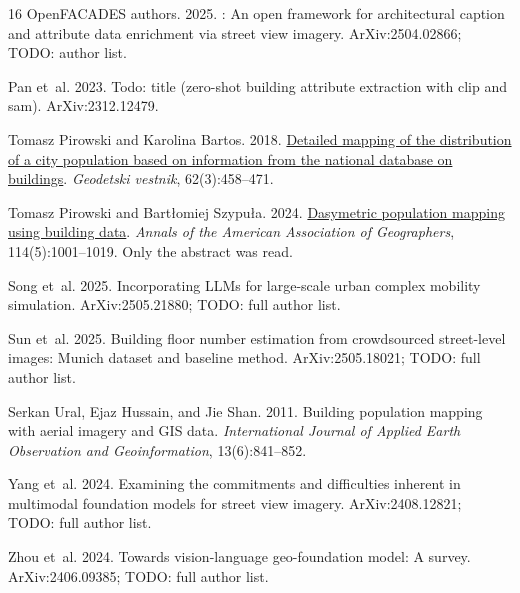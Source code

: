 \documentclass[11pt]{article}
\begin{document}
\begin{thebibliography}{16}
{OpenFACADES authors}. 2025.
: An open framework for architectural caption and
  attribute data enrichment via street view imagery.
\newblock ArXiv:2504.02866; TODO: author list.

Pan et~al. 2023.
\newblock Todo: title (zero-shot building attribute extraction with clip and
  sam).
\newblock ArXiv:2312.12479.

Tomasz Pirowski and Karolina Bartos. 2018.
\newblock \href {https://doi.org/10.15292/geodetski-vestnik.2018.03.458-471}
  {Detailed mapping of the distribution of a city population based on
  information from the national database on buildings}.
\newblock \emph{Geodetski vestnik}, 62(3):458--471.

Tomasz Pirowski and Bart{\l}omiej Szypu{\l}a. 2024.
\newblock \href {https://doi.org/10.1080/24694452.2024.2313500} {Dasymetric
  population mapping using building data}.
\newblock \emph{Annals of the American Association of Geographers},
  114(5):1001--1019.
\newblock Only the abstract was read.

Song et~al. 2025.
\newblock Incorporating {LLMs} for large-scale urban complex mobility
  simulation.
\newblock ArXiv:2505.21880; TODO: full author list.

Sun et~al. 2025.
\newblock Building floor number estimation from crowdsourced street-level
  images: {Munich} dataset and baseline method.
\newblock ArXiv:2505.18021; TODO: full author list.

Serkan Ural, Ejaz Hussain, and Jie Shan. 2011.
\newblock Building population mapping with aerial imagery and {GIS} data.
\newblock \emph{International Journal of Applied Earth Observation and
  Geoinformation}, 13(6):841--852.

Yang et~al. 2024.
\newblock Examining the commitments and difficulties inherent in multimodal
  foundation models for street view imagery.
\newblock ArXiv:2408.12821; TODO: full author list.

Zhou et~al. 2024.
\newblock Towards vision-language geo-foundation model: A survey.
\newblock ArXiv:2406.09385; TODO: full author list.

\end{thebibliography}
\end{document}

